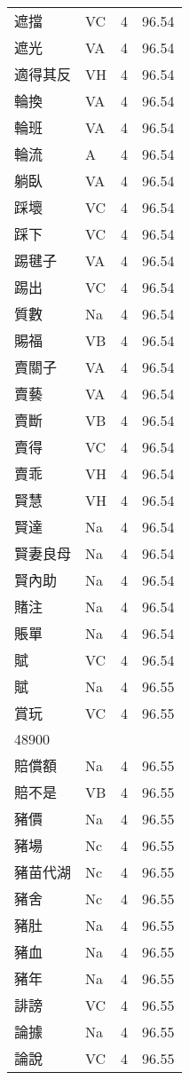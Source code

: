 \documentclass[twocolumn]{book}
\begin{document}
\begin{supertabular}{llrr}
遮擋 & VC & 4 &  96.54\\
遮光 & VA & 4 &  96.54\\
適得其反 & VH & 4 &  96.54\\
輪換 & VA & 4 &  96.54\\
輪班 & VA & 4 &  96.54\\
輪流 & A & 4 &  96.54\\
躺臥 & VA & 4 &  96.54\\
踩壞 & VC & 4 &  96.54\\
踩下 & VC & 4 &  96.54\\
踢毽子 & VA & 4 &  96.54\\
踢出 & VC & 4 &  96.54\\
質數 & Na & 4 &  96.54\\
賜福 & VB & 4 &  96.54\\
賣關子 & VA & 4 &  96.54\\
賣藝 & VA & 4 &  96.54\\
賣斷 & VB & 4 &  96.54\\
賣得 & VC & 4 &  96.54\\
賣乖 & VH & 4 &  96.54\\
賢慧 & VH & 4 &  96.54\\
賢達 & Na & 4 &  96.54\\
賢妻良母 & Na & 4 &  96.54\\
賢內助 & Na & 4 &  96.54\\
賭注 & Na & 4 &  96.54\\
賬單 & Na & 4 &  96.54\\
賦 & VC & 4 &  96.54\\
賦 & Na & 4 &  96.55\\
賞玩 & VC & 4 &  96.55\\
48900\\
賠償額 & Na & 4 &  96.55\\
賠不是 & VB & 4 &  96.55\\
豬價 & Na & 4 &  96.55\\
豬場 & Nc & 4 &  96.55\\
豬苗代湖 & Nc & 4 &  96.55\\
豬舍 & Nc & 4 &  96.55\\
豬肚 & Na & 4 &  96.55\\
豬血 & Na & 4 &  96.55\\
豬年 & Na & 4 &  96.55\\
誹謗 & VC & 4 &  96.55\\
論據 & Na & 4 &  96.55\\
論說 & VC & 4 &  96.55\\

\end{supertabular}
\end{document}
